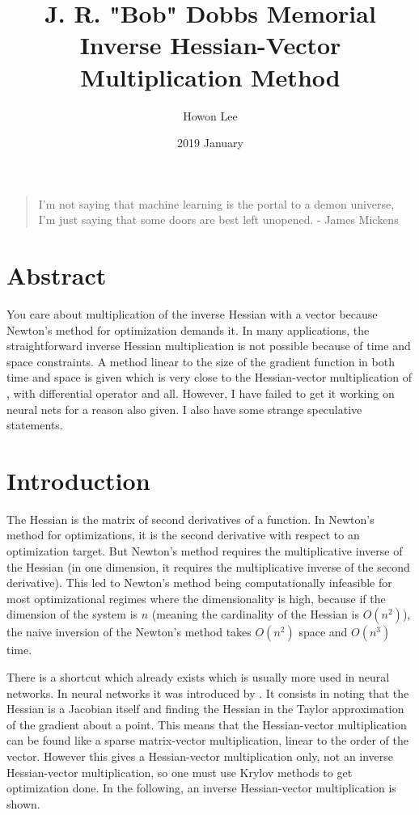 \documentclass{article}
\begin{document}
\title{J. R. "Bob" Dobbs Memorial Inverse Hessian-Vector Multiplication Method}
\author{Howon Lee}
\date{2019 January}
\maketitle

\begin{quote}
I'm not saying that machine learning is the portal to a demon universe, I'm just saying that some doors are best left unopened. - James Mickens
\end{quote}

\section{Abstract}
You care about multiplication of the inverse Hessian with a vector because Newton's method for optimization demands it. In many applications, the straightforward inverse Hessian multiplication is not possible because of time and space constraints. A method linear to the size of the gradient function in both time and space is given which is very close to the Hessian-vector multiplication of \cite{pearlmutter1994}, with differential operator and all. However, I have failed to get it working on neural nets for a reason also given. I also have some strange speculative statements.

\section{Introduction}

The Hessian is the matrix of second derivatives of a function. In Newton's method for optimizations, it is the second derivative with respect to an optimization target. But Newton's method requires the multiplicative inverse of the Hessian (in one dimension, it requires the multiplicative inverse of the second derivative). This led to Newton's method being computationally infeasible for most optimizational regimes where the dimensionality is high, because if the dimension of the system is $n$ (meaning the cardinality of the Hessian is $O(n^2)$), the naive inversion of the Newton's method takes $O(n^2)$ space and $O(n^3)$ time.

There is a shortcut which already exists which is usually more used in neural networks. In neural networks it was introduced by \cite{pearlmutter1994}. It consists in noting that the Hessian is a Jacobian itself and finding the Hessian in the Taylor approximation of the gradient about a point. This means that the Hessian-vector multiplication can be found like a sparse matrix-vector multiplication, linear to the order of the vector. However this gives a Hessian-vector multiplication only, not an inverse Hessian-vector multiplication, so one must use Krylov methods to get optimization done\cite{martens2010}. In the following, an inverse Hessian-vector multiplication is shown.
\end{document}
